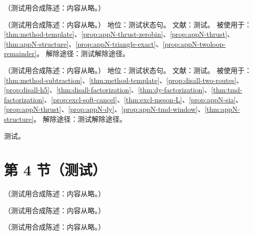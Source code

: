\begin{remark}\label{rem:appN-forest}
（测试用合成陈述：内容从略。）
\end{remark}

\begin{assumption}[发散链项的取值规则]\label{asm:appN-values}
（测试用合成陈述：内容从略。）
地位：测试状态句。
文献：测试。
被使用于：\cref{thm:method-template}、\cref{prop:appN-thrust-zerobin}、\cref{prop:appN-thrust}、\cref{thm:appN-structure}、\cref{prop:appN-triangle-exact}、\cref{prop:appN-twoloop-remainder}。
解除途径：测试解除途径。
\end{assumption}

\begin{assumption}\label{asm:appN-collins}
（测试用合成陈述：内容从略。）
地位：测试状态句。
文献：测试。
被使用于：\cref{thm:method-subtraction}、\cref{thm:method-template}、\cref{prop:disall-two-routes}、\cref{prop:disall-h5}、\cref{thm:disall-factorization}、\cref{thm:dy-factorization}、\cref{thm:tmd-factorization}、\cref{prop:excl-soft-cancel}、\cref{thm:excl-meson-L}、\cref{prop:appN-sia}、\cref{prop:appN-thrust}、\cref{prop:appN-dy}、\cref{prop:appN-tmd-window}、\cref{thm:appN-structure}。
解除途径：测试解除途径。
\end{assumption}
\begin{proofsketch}测试。\end{proofsketch}

\section{第 4 节（测试）}\label{sec:appN-approximators}

\begin{definition}\label{def:appN-tmd-approx}
（测试用合成陈述：内容从略。）
\end{definition}

\begin{definition}[遍举近似子与分布振幅投影]\label{def:appN-excl-approx}
（测试用合成陈述：内容从略。）
\end{definition}

\begin{lemma}[近似子的代数]\label{lem:appN-algebra}
（测试用合成陈述：内容从略。）
\end{lemma}

